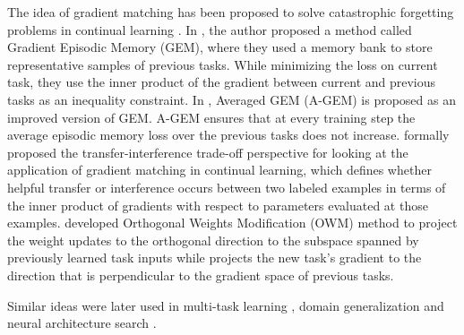 The idea of gradient matching has been proposed to solve catastrophic forgetting problems in continual learning \citep{lopez-pazGradientEpisodicMemory2017, chaudhry2018efficient, riemer2018learning, zeng2019continual, farajtabar2020orthogonal}.
In \citet{lopez-pazGradientEpisodicMemory2017}, the author proposed a method called Gradient Episodic Memory (GEM), where they used a memory bank to store representative samples of previous tasks.
While minimizing the loss on current task, they use the inner product of the gradient between current and previous tasks as an inequality constraint.
In \citet{chaudhry2018efficient}, Averaged GEM (A-GEM) is proposed as an improved version of GEM.
A-GEM ensures that at every training step the average episodic memory loss over the previous tasks does not increase. 
\citet{riemer2018learning} formally proposed the transfer-interference trade-off perspective for looking at the application of gradient matching in continual learning, which defines whether helpful transfer or interference occurs between two labeled examples in terms of the inner product of gradients with respect to parameters evaluated at those examples.
\citet{zeng2019continual} developed Orthogonal Weights Modification (OWM) method to project the weight updates to the orthogonal direction to the subspace spanned by previously learned task inputs while 
\citet{farajtabar2020orthogonal} projects the new task's gradient to the direction that is perpendicular to the gradient space of previous tasks.

Similar ideas were later used in multi-task learning \citep{duAdaptingAuxiliaryLosses2020, yuGradientSurgeryMultiTask2020}, domain generalization \cite{shi2021gradient} and neural architecture search \citep{gong2021nasvit}.


